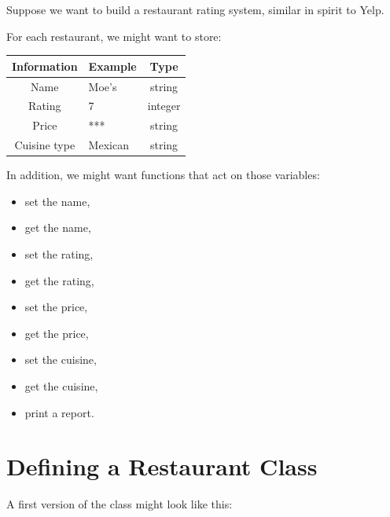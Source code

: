 \documentclass[11pt]{article}
\begin{document}
Suppose we want to build a restaurant rating system, similar in spirit to Yelp.

For each restaurant, we might want to store:

\begin{center}
\begin{tabular}{clc}
\toprule
Information & Example & Type \\
\midrule
Name & Moe's & string \\
Rating & 7 & integer \\
Price & *** & string \\
Cuisine type & Mexican & string \\
\bottomrule
\end{tabular}
\end{center}

In addition, we might want functions that act on those variables:

\begin{itemize}
    \item set the name,
    \item get the name,
    \item set the rating,
    \item get the rating,
    \item set the price,
    \item get the price,
    \item set the cuisine,
    \item get the cuisine,
    \item print a report.
\end{itemize}

\section{Defining a Restaurant Class}

A first version of the class might look like this:
\end{document}
